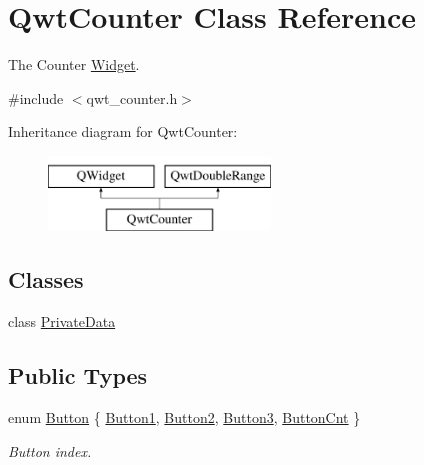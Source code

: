 \hypertarget{class_qwt_counter}{\section{Qwt\-Counter Class Reference}
\label{class_qwt_counter}
}


The Counter \hyperlink{class_widget}{Widget}.  




{\ttfamily \#include $<$qwt\-\_\-counter.\-h$>$}

Inheritance diagram for Qwt\-Counter\-:\begin{figure}[H]
\begin{center}
\leavevmode
\includegraphics[height=2.000000cm]{class_qwt_counter}
\end{center}
\end{figure}
\subsection*{Classes}
\begin{DoxyCompactItemize}
\item 
class \hyperlink{class_qwt_counter_1_1_private_data}{Private\-Data}
\end{DoxyCompactItemize}
\subsection*{Public Types}
\begin{DoxyCompactItemize}
\item 
enum \hyperlink{class_qwt_counter_a027cfd91946ca9a19a1d606411e0f374}{Button} \{ \hyperlink{class_qwt_counter_a027cfd91946ca9a19a1d606411e0f374a1b29fe43c7d59986eb5854ddaf6f7179}{Button1}, 
\hyperlink{class_qwt_counter_a027cfd91946ca9a19a1d606411e0f374a6015e556fcb8c4d45126dee5435b478d}{Button2}, 
\hyperlink{class_qwt_counter_a027cfd91946ca9a19a1d606411e0f374a30b64d40b31283807f1a4f3d57af0e74}{Button3}, 
\hyperlink{class_qwt_counter_a027cfd91946ca9a19a1d606411e0f374aca8e93a2d129f7cc91f54f5f4da20c5f}{Button\-Cnt}
 \}
\begin{DoxyCompactList}\small\item\em Button index. \end{DoxyCompactList}\end{DoxyCompactItemize}

